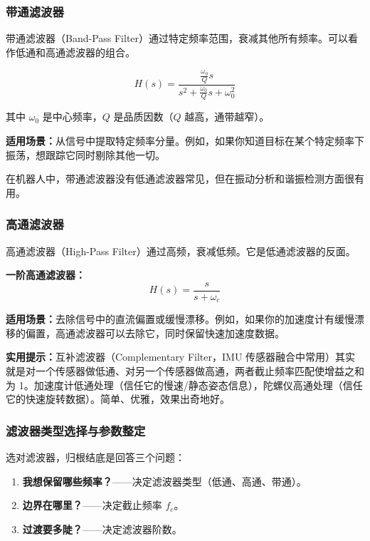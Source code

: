 \documentclass[UTF8]{ctexart}
\begin{document}
\subsubsection{带通滤波器}

带通滤波器（Band-Pass Filter）通过特定频率范围，衰减其他所有频率。可以看作低通和高通滤波器的组合。

\begin{equation}
H(s) = \frac{\frac{\omega_0}{Q} s}{s^2 + \frac{\omega_0}{Q} s + \omega_0^2}
\end{equation}

其中 $\omega_0$ 是中心频率，$Q$ 是品质因数（$Q$ 越高，通带越窄）。

\textbf{适用场景：}从信号中提取特定频率分量。例如，如果你知道目标在某个特定频率下振荡，想跟踪它同时剔除其他一切。

在机器人中，带通滤波器没有低通滤波器常见，但在振动分析和谐振检测方面很有用。

\subsubsection{高通滤波器}

高通滤波器（High-Pass Filter）通过高频，衰减低频。它是低通滤波器的反面。

\textbf{一阶高通滤波器：}
\begin{equation}
H(s) = \frac{s}{s + \omega_c}
\end{equation}

\textbf{适用场景：}去除信号中的直流偏置或缓慢漂移。例如，如果你的加速度计有缓慢漂移的偏置，高通滤波器可以去除它，同时保留快速加速度数据。

\textbf{实用提示：}互补滤波器（Complementary Filter，IMU 传感器融合中常用）其实就是对一个传感器做低通、对另一个传感器做高通，两者截止频率匹配使增益之和为 1。加速度计低通处理（信任它的慢速/静态姿态信息），陀螺仪高通处理（信任它的快速旋转数据）。简单、优雅，效果出奇地好。

\subsubsection{滤波器类型选择与参数整定}

选对滤波器，归根结底是回答三个问题：
\begin{enumerate}
    \item \textbf{我想保留哪些频率？}——决定滤波器类型（低通、高通、带通）。
    \item \textbf{边界在哪里？}——决定截止频率 $f_c$。
    \item \textbf{过渡要多陡？}——决定滤波器阶数。
\end{enumerate}
\end{document}
